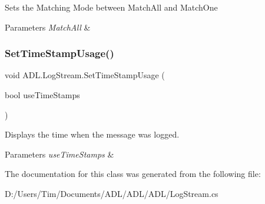 Sets the Matching Mode between Match\+All and Match\+One 


\begin{DoxyParams}{Parameters}
{\em Match\+All} & \\
\hline
\end{DoxyParams}
\mbox{\label{class_a_d_l_1_1_log_stream_a533f3bae752ab3ee1c3f1aaac23a7d05}} 
\subsubsection{\texorpdfstring{Set\+Time\+Stamp\+Usage()}{SetTimeStampUsage()}}
{\footnotesize\ttfamily void A\+D\+L.\+Log\+Stream.\+Set\+Time\+Stamp\+Usage (\begin{DoxyParamCaption}\item[{bool}]{use\+Time\+Stamps }\end{DoxyParamCaption})}



Displays the time when the message was logged. 


\begin{DoxyParams}{Parameters}
{\em use\+Time\+Stamps} & \\
\hline
\end{DoxyParams}


The documentation for this class was generated from the following file\+:\begin{DoxyCompactItemize}
\item 
D\+:/\+Users/\+Tim/\+Documents/\+A\+D\+L/\+A\+D\+L/\+A\+D\+L/Log\+Stream.\+cs\end{DoxyCompactItemize}
